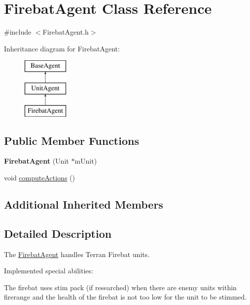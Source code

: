 \hypertarget{class_firebat_agent}{\section{Firebat\-Agent Class Reference}
\label{class_firebat_agent}
}


{\ttfamily \#include $<$Firebat\-Agent.\-h$>$}

Inheritance diagram for Firebat\-Agent\-:\begin{figure}[H]
\begin{center}
\leavevmode
\includegraphics[height=3.000000cm]{class_firebat_agent}
\end{center}
\end{figure}
\subsection*{Public Member Functions}
\begin{DoxyCompactItemize}
\item 
\hypertarget{class_firebat_agent_aa86f0baec326b9284fb9137576c7e0d6}{{\bfseries Firebat\-Agent} (Unit $\ast$m\-Unit)}\label{class_firebat_agent_aa86f0baec326b9284fb9137576c7e0d6}

\item 
void \hyperlink{class_firebat_agent_a56f4a45bde7387b2acea59b4c0b3554f}{compute\-Actions} ()
\end{DoxyCompactItemize}
\subsection*{Additional Inherited Members}


\subsection{Detailed Description}
The \hyperlink{class_firebat_agent}{Firebat\-Agent} handles Terran Firebat units.

Implemented special abilities\-:
\begin{DoxyItemize}
\item The firebat uses stim pack (if researched) when there are enemy units within firerange and the health of the firebat is not too low for the unit to be stimmed.
\end{DoxyItemize}

